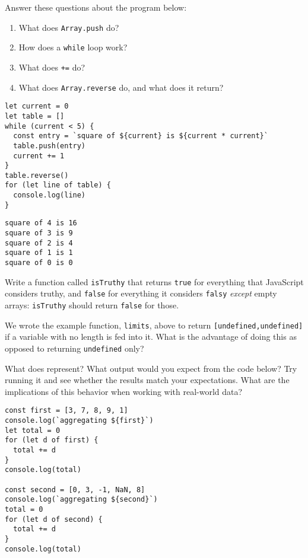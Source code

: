 
Answer these questions about the program below:

\begin{enumerate}
\item
  What does \texttt{Array.push} do?
\item
  How does a \texttt{while} loop work?
\item
  What does \texttt{+=} do?
\item
  What does \texttt{Array.reverse} do, and what does it return?
\end{enumerate}

\begin{verbatim}
let current = 0
let table = []
while (current < 5) {
  const entry = `square of ${current} is ${current * current}`
  table.push(entry)
  current += 1
}
table.reverse()
for (let line of table) {
  console.log(line)
}
\end{verbatim}

\begin{verbatim}
square of 4 is 16
square of 3 is 9
square of 2 is 4
square of 1 is 1
square of 0 is 0
\end{verbatim}


Write a function called \texttt{isTruthy} that returns \texttt{true} for everything that JavaScript considers truthy,
and \texttt{false} for everything it considers \texttt{falsy} \emph{except} empty arrays:
\texttt{isTruthy} should return \texttt{false} for those.


We wrote the example function, \texttt{limits},
above to return \texttt{[undefined,undefined]} if a variable
with no length is fed into it.
What is the advantage of doing this as opposed to
returning \texttt{undefined} only?


What does  represent?
What output would you expect from the code below?
Try running it and see whether the results match your expectations.
What are the implications of this behavior when working with real-world data?

\begin{verbatim}
const first = [3, 7, 8, 9, 1]
console.log(`aggregating ${first}`)
let total = 0
for (let d of first) {
  total += d
}
console.log(total)

const second = [0, 3, -1, NaN, 8]
console.log(`aggregating ${second}`)
total = 0
for (let d of second) {
  total += d
}
console.log(total)
\end{verbatim}

